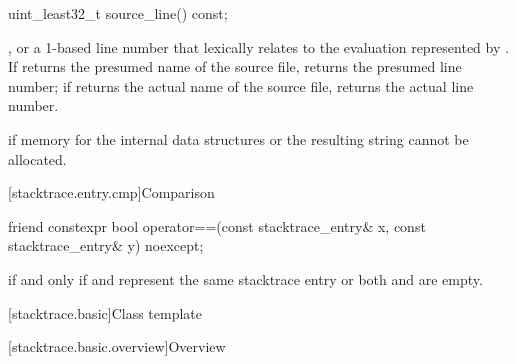 %
\begin{itemdecl}
uint_least32_t source_line() const;
\end{itemdecl}

\begin{itemdescr}
\pnum
\returns
{}, or a 1-based line number that lexically relates to the evaluation
represented by .
If  returns the presumed name of the source file,
returns the presumed line number;
if  returns the actual name of the source file,
returns the actual line number.

\pnum
\throws
{} if memory for
the internal data structures or the resulting string cannot be allocated.
\end{itemdescr}

[stacktrace.entry.cmp]{Comparison}

%
\begin{itemdecl}
friend constexpr bool operator==(const stacktrace_entry& x, const stacktrace_entry& y) noexcept;
\end{itemdecl}

\begin{itemdescr}
\pnum
\returns
{} if and only if  and  represent
the same stacktrace entry or both  and  are empty.
\end{itemdescr}

[stacktrace.basic]{Class template }

[stacktrace.basic.overview]{Overview}

